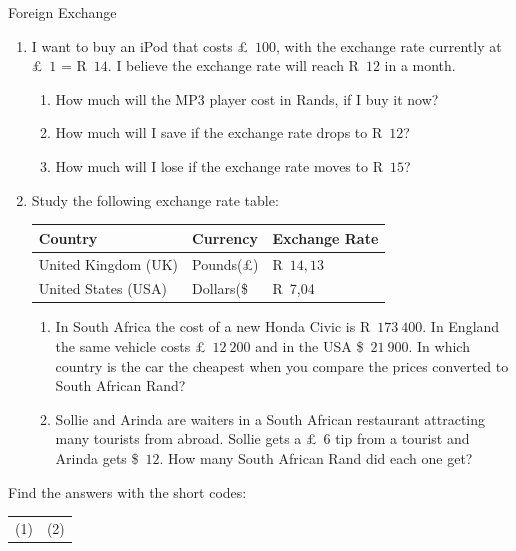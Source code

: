 \begin{exercises}{Foreign Exchange}
    \begin{enumerate}[label=\textbf{\arabic*}.]
	\item I want to buy an iPod that costs £~$100$, with the exchange rate currently at £~$1$ = R~$14$. I believe the exchange rate will reach R~$12$ in a month.
	\begin{enumerate}
	    \item How much will the MP3 player cost in Rands, if I buy it now?
	    \item How much will I save if the exchange rate drops to R~$12$?
	    \item How much will I lose if the exchange rate moves to R~$15$?
	\end{enumerate}

	\item Study the following exchange rate table:
	\begin{center}
	    \begin{tabular}{ |l|l|l| }
		\hline
		Country	&	Currency	&	Exchange Rate\\ \hline
		United Kingdom (UK)	&	Pounds(£)	&	R~$14,13$\\ \hline
		United States (USA)	&	Dollars(\$}	&	R~7,04\\ \hline
	    \end{tabular}
	\end{center}
	
	\begin{enumerate}
	    \item In South Africa the cost of a new Honda Civic is R~$173~400$. In England the same vehicle costs £~$12~200$ and in the USA \$~$21~900$. In which country is the car the cheapest when you compare the prices converted to South African Rand?

	    \item Sollie and Arinda are waiters in a South African restaurant attracting many tourists from abroad. Sollie gets a £~$6$ tip from a tourist and Arinda gets \$~$12$. How many South African Rand did each one get?
	\end{enumerate}
    \end{enumerate}

    Find the answers with the short codes:\\
    \begin{tabularx}{\textwidth}{ XX }
	(1)	&	(2)\\
    \end{tabularx}
\end{exercises}


